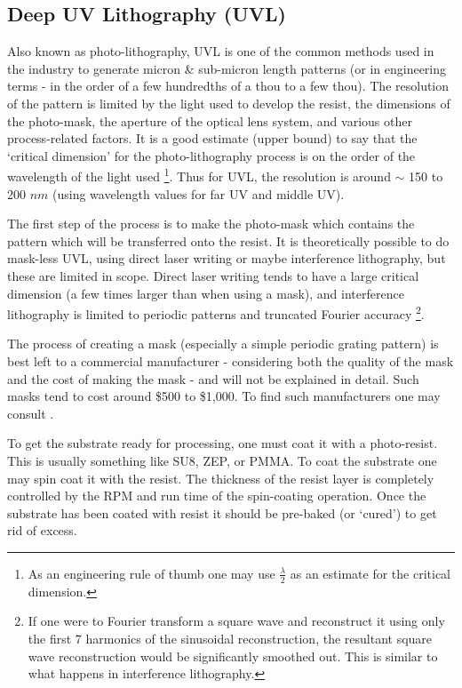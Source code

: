 \subsection{Deep UV Lithography (UVL)}

Also known as photo-lithography, UVL is one of the common methods used in the industry to generate micron \& sub-micron length patterns (or in engineering terms - in the order of a few hundredths of a thou to a few thou). The resolution of the pattern is limited by the light used to develop the resist, the dimensions of the photo-mask, the aperture of the optical lens system, and various other process-related factors. It is a good estimate (upper bound) to say that the `critical dimension' for the photo-lithography process is on the order of the wavelength of the light used \footnote{As an engineering rule of thumb one may use $\frac{\lambda}{2}$ as an estimate for the critical dimension.}. Thus for UVL, the resolution is around $\sim$ 150 to 200 $nm$ (using wavelength values for far UV and middle UV). 

The first step of the process is to make the photo-mask which contains the pattern which will be transferred onto the resist. It is theoretically possible to do mask-less UVL, using direct laser writing or maybe interference lithography, but these are limited in scope. Direct laser writing tends to have a large critical dimension (a few times larger than when using a mask), and interference lithography is limited to periodic patterns and truncated Fourier accuracy \footnote{If one were to Fourier transform a square wave and reconstruct it using only the first 7 harmonics of the sinusoidal reconstruction, the resultant square wave reconstruction would be significantly smoothed out. This is similar to what happens in interference lithography.}. 

The process of creating a mask (especially a simple periodic grating pattern) is best left to a commercial manufacturer - considering both the quality of the mask and the cost of making the mask - and will not be explained in detail. Such masks tend to cost around \$500 to \$1,000. To find such manufacturers one may consult \cite{mask_ind}. 

To get the substrate ready for processing, one must coat it with a photo-resist. This is usually something like SU8, ZEP, or PMMA. To coat the substrate one may spin coat it with the resist. The thickness of the resist layer is completely controlled by the RPM and run time of the spin-coating operation. Once the substrate has been coated with resist it should be pre-baked (or `cured') to get rid of excess.

